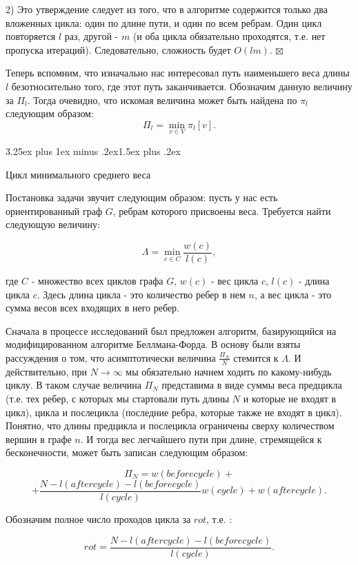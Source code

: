 \documentclass[a4paper,12pt]{report}
\makeatletter
\theoremstyle{plain} %
\theoremstyle{definition}
\theoremstyle{remark}
\renewcommand{\subsection}{\@startsection{subsection}{2}{18pt}%
{3.25ex plus 1ex minus .2ex}{1.5ex plus .2ex}%
{\normalfont\large\bfseries\raggedright}}%
\makeatother
\begin{document}
\begin{large}
2) Это утверждение следует из того, что в алгоритме содержится только два вложенных цикла: один по длине пути, и один по всем ребрам. Один цикл повторяется $l$ раз, другой - $m$ (и оба цикла обязательно проходятся, т.е. нет пропуска итераций). Следовательно, сложность будет $O(lm)$.
$\boxtimes$

\bigskip

Теперь вспомним, что изначально нас интересовал путь наименьшего веса длины $l$ безотносительно того, где этот путь заканчивается. Обозначим данную величину за $\Pi_l$. Тогда очевидно, что искомая величина может быть найдена по $\pi_l$ следующим образом: $$\Pi_l = \min_{v \in V} \pi_l[v].$$

\subsection{Цикл минимального среднего веса}

Постановка задачи звучит следующим образом: пусть у нас есть ориентированный граф $G$, ребрам которого присвоены веса. Требуется найти следующую величину:

$$\Lambda = \min _{c \in C} \frac{w(c)}{l(c)},$$

где $C$ - множество всех циклов графа $G$, $w(c)$ - вес цикла $c$, $l(c)$ - длина цикла $c$. Здесь длина цикла - это количество ребер в нем $n$, а вес цикла - это сумма весов всех входящих в него ребер.

Сначала в процессе исследований был предложен алгоритм, базирующийся на модифицированном алгоритме Беллмана-Форда. В основу были взяты рассуждения о том, что асимптотически величина $\frac{\Pi_N}{N}$ стемится к $\Lambda$.  И действительно, при $N \rightarrow \infty$ мы обязательно начнем ходить по какому-нибудь циклу. В таком случае величина $\Pi_N$ представима в виде суммы веса предцикла (т.е. тех ребер, с которых мы стартовали путь длины $N$ и которые не входят в цикл), цикла и послецикла (последние ребра, которые также не входят в цикл). Понятно, что длины предцикла и послецикла ограничены сверху количеством вершин в графе $n$. И тогда вес легчайшего пути при длине, стремящейся к бесконечности, может быть записан следующим образом:

$$\Pi_N = w(beforecycle) + $$
$$+\frac{N - l(aftercycle) - l(beforecycle)}{l(cycle)}w(cycle) + w(aftercycle).$$

Обозначим полное число проходов цикла за $rot$, т.е. :

$$rot =  \frac{N - l(aftercycle) - l(beforecycle)}{l(cycle)}.$$


\end{large}
\end{document}
